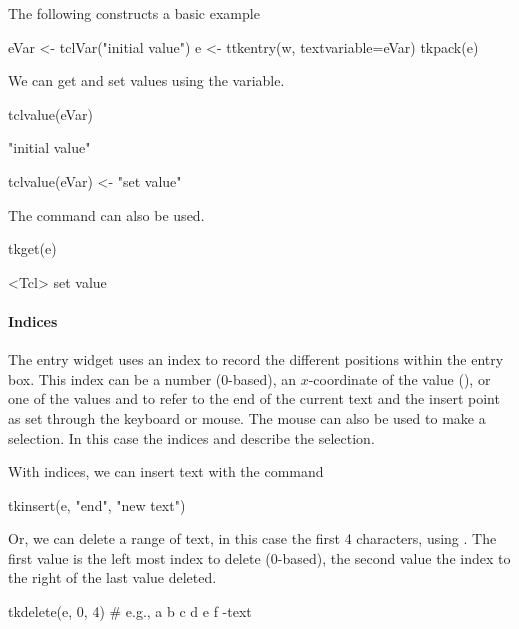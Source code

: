 The following constructs a basic example
\begin{Schunk}
\begin{Sinput}
 eVar <- tclVar("initial value")
 e <- ttkentry(w, textvariable=eVar)
 tkpack(e)
\end{Sinput}
\end{Schunk}

We can get and set values using the \TCL\/ variable.
\begin{Schunk}
\begin{Sinput}
 tclvalue(eVar)
\end{Sinput}
\begin{Soutput}
[1] "initial value"
\end{Soutput}
\begin{Sinput}
 tclvalue(eVar) <- "set value"
\end{Sinput}
\end{Schunk}

The  command can also be used.
\begin{Schunk}
\begin{Sinput}
 tkget(e)
\end{Sinput}
\begin{Soutput}
<Tcl> set value 
\end{Soutput}
\end{Schunk}

\paragraph{Indices}
The entry widget uses an index to record the different positions
within the entry box. This index can be a number (0-based), an
$x$-coordinate of the value (), or one of the values
 and  to refer to the end of the current text
and the insert point as set through the keyboard or mouse. The mouse
can also be used to make a selection. In this case the indices
 and  describe the selection.

With indices, we can insert  text with the  command
\begin{Schunk}
\begin{Sinput}
 tkinsert(e, "end", "new text")
\end{Sinput}
\end{Schunk}

Or, we can delete a range of text, in this case the first 4
characters, using . The first value is
the left most index to delete (0-based), the second value the index to
the right of the last value deleted.
\begin{Schunk}
\begin{Sinput}
 tkdelete(e, 0, 4) # e.g.,  a b c d e f   -text
\end{Sinput}
\end{Schunk}

